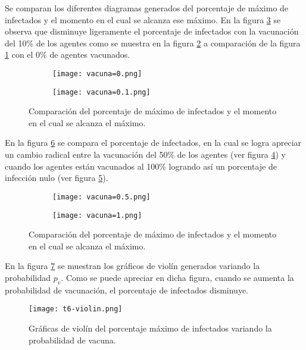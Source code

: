 \documentclass[12pt]{amsart}
\begin{document}
Se comparan los diferentes diagramas generados del porcentaje de máximo de infectados y el momento en el cual se alcanza ese máximo. En la figura \ref{fig2} se observa que disminuye ligeramente el porcentaje de infectados con la vacunación del 10\% de los agentes como se muestra en la figura \ref{2b} a comparación de la figura \ref{2a} con el 0\% de agentes vacunados.
\begin{figure}[h!]
\centering
\begin{subfigure}[H]{0.4\linewidth}
\texttt{[image: vacuna=0.png]}
\caption{}
\label{2a}
\end{subfigure}
\begin{subfigure}[H]{0.4\linewidth}
\texttt{[image: vacuna=0.1.png]}
\caption{}
\label{2b}
\end{subfigure}
\caption{Comparación del porcentaje de máximo de infectados y el momento en el cual se alcanza el máximo.}
\label{fig2}
\end{figure}

\clearpage
En la figura \ref{fig3} se compara el porcentaje de infectados, en la cual se logra apreciar un cambio radical entre la vacunación del 50\% de los agentes (ver figura \ref{3a}) y cuando los agentes están vacunados al 100\% logrando así un porcentaje de infección nulo (ver figura \ref{3b}).
\begin{figure}[h!]
\centering
\begin{subfigure}[H]{0.45\linewidth}
\texttt{[image: vacuna=0.5.png]}
\caption{}
\label{3a}
\end{subfigure}
\begin{subfigure}[H]{0.45\linewidth}
\texttt{[image: vacuna=1.png]}
\caption{}
\label{3b}
\end{subfigure}
\caption{Comparación del porcentaje de máximo de infectados y el momento en el cual se alcanza el máximo.}
\label{fig3}
\end{figure}

En la figura \ref{fig4} se muestran los gráficos de violín generados variando la probabilidad $p_v$. Como se puede apreciar en dicha figura, cuando se aumenta la probabilidad de vacunación, el porcentaje de infectados disminuye. 
\begin{figure} [h!]
    \centering
    \texttt{[image: t6-violin.png]}
    \caption{Gráficas de violín del porcentaje máximo de infectados variando la probabilidad de vacuna.}
    \label{fig4}
\end{figure}
\end{document}
